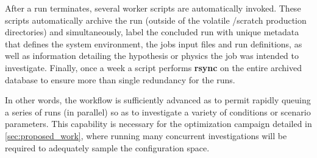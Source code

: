 After a run terminates, several worker scripts are automatically invoked. 
These scripts automatically archive the run (outside of the volatile /scratch 
production directories) and simultaneously, label the concluded run with
unique metadata that defines the system environment, the jobs input
files and run definitions, as well as information detailing the
hypothesis or physics the job was intended to investigate. Finally, once
a week a script performs \textbf{rsync} on the entire archived database to
ensure more than single redundancy for the runs. 

In other words, the workflow is sufficiently advanced as to permit
rapidly queuing a series of runs (in parallel) so as to
investigate a variety of conditions or scenario parameters. This
capability is necessary for the optimization campaign detailed in
\ref{sec:proposed_work}, where running many concurrent investigations
will be required to adequately sample the configuration space. 
